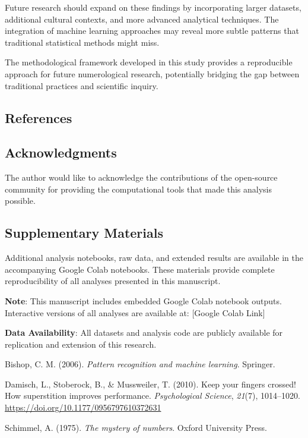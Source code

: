 \documentclass[
  american,
  11pt,
  oneside]{article}
\newlength{\cslhangindent}
\newenvironment{CSLReferences}[2] %
 {\begin{list}{}{%
  \setlength{\itemindent}{0pt}
  \setlength{\leftmargin}{0pt}
  \setlength{\parsep}{0pt}
  \ifodd #1
   \setlength{\leftmargin}{\cslhangindent}
   \setlength{\itemindent}{-1\cslhangindent}
  \fi
  \setlength{\itemsep}{#2\baselineskip}}}
 {\end{list}}
\begin{document}
Future research should expand on these findings by incorporating larger
datasets, additional cultural contexts, and more advanced analytical
techniques. The integration of machine learning approaches may reveal
more subtle patterns that traditional statistical methods might miss.

The methodological framework developed in this study provides a
reproducible approach for future numerological research, potentially
bridging the gap between traditional practices and scientific inquiry.

\subsection{References}\label{references}

\subsection{Acknowledgments}\label{acknowledgments}

The author would like to acknowledge the contributions of the
open-source community for providing the computational tools that made
this analysis possible.

\subsection{Supplementary Materials}\label{supplementary-materials}

Additional analysis notebooks, raw data, and extended results are
available in the accompanying Google Colab notebooks. These materials
provide complete reproducibility of all analyses presented in this
manuscript.

\textbf{Note}: This manuscript includes embedded Google Colab notebook
outputs. Interactive versions of all analyses are available at:
{[}Google Colab Link{]}

\textbf{Data Availability}: All datasets and analysis code are publicly
available for replication and extension of this research.

\label{refs}
\begin{CSLReferences}{1}{0}
Bishop, C. M. (2006). \emph{Pattern recognition and machine learning}.
Springer.

Damisch, L., Stoberock, B., \& Mussweiler, T. (2010). Keep your fingers
crossed! How superstition improves performance. \emph{Psychological
Science}, \emph{21}(7), 1014--1020.
\url{https://doi.org/10.1177/0956797610372631}

Schimmel, A. (1975). \emph{The mystery of numbers}. Oxford University
Press.

\end{CSLReferences}
\end{document}
